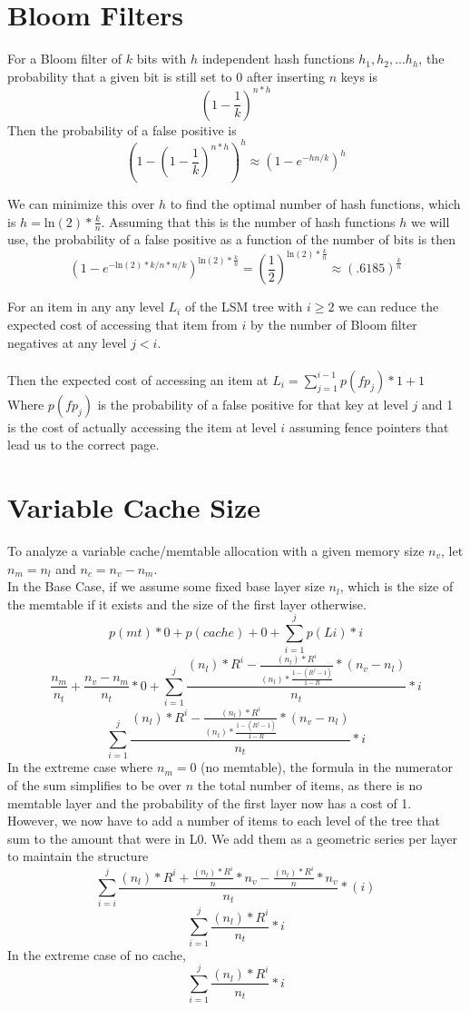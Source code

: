 \documentclass[11pt]{article}
\theoremstyle{plain}
\theoremstyle{definition}
\begin{document}
\section{Bloom Filters}

For a Bloom filter of $k$ bits with $h$ independent hash functions $h_1, h_2,...h_h$, the probability that a given bit is still set to 0 after inserting $n$ keys is 
$$
(1 - \frac{1}{k})^{n*h}
$$
Then the probability of a false positive is 
$$
(1- (1 - \frac{1}{k})^{n*h})^h \approx (1 - e^{-hn/k})^h
$$

We can minimize this over $h$ to find the optimal number of hash functions, which is $h = \mathrm{ln}(2) * \frac{k}{n}$. Assuming that this is the number of hash functions $h$ we will use, the probability of a false positive as a function of the number of bits is then 
$$
(1 - e^{-\mathrm{ln}(2)*k/n*n/k})^{\mathrm{ln}(2) * \frac{k}{n}} = (\frac{1}{2}) ^ {\mathrm{ln}(2) * \frac{k}{n}} \approx (.6185) ^  {\frac{k}{n}}
$$

For an item in any any level $L_i$ of the LSM tree with $i \geq 2$ we can reduce the expected cost of accessing that item from $i$ by the number of Bloom filter negatives at any level $j<i$. \\ \\
Then the expected cost of accessing an item at $L_i =  \sum_{j=1}^{i-1} p(fp_j) * 1 + 1$
Where $p(fp_j)$ is the probability of a false positive for that key at level $j$ and 1 is the cost of actually accessing the item at level $i$ assuming fence pointers that lead us to the correct page.

\section{Variable Cache Size}
To analyze a variable cache/memtable allocation with a given memory size $n_v$, let $n_m = n_l$ and $n_c =n_v - n_m$.\\
In the Base Case, if we assume some fixed base layer size $n_l$, which is the size of the memtable if it exists and the size of the first layer otherwise.
$$
p(mt) * 0  + p(cache) + 0 + \sum_{i=1}^j p(Li) * i 
$$
$$
\frac{n_m}{n_t} +  \frac{n_v - n_m}{n_t}*0 + \sum_{i=1}^j \frac{(n_l) * R^i - \frac{(n_l) * R^i}{(n_l) * \frac{1-(R^j-1)}{1-R}} * (n_v-n_l)}{n_t} * i 
$$
$$
\sum_{i=1}^j \frac{(n_l) * R^i - \frac{(n_l) * R^i}{(n_l) * \frac{1-(R^j-1)}{1-R}} * (n_v-n_l)}{n_t} * i 
$$
In the extreme case where $n_m=0$ (no memtable), the formula in the numerator of the sum simplifies to be over $n$ the total number of items, as there is no memtable layer and the probability of the first layer now has a cost of 1. However, we now have to add a number of items to each level of the tree that sum to the amount that were in L0. We add them as a geometric series per layer to maintain the structure
$$
\sum_{i=i}^{j} \frac{(n_l) * R^{i} + \frac{(n_l) * R^{i}}{n} * n_v - \frac{(n_l) * R^{i}}{n} * n_v}{n_t} * (i)
$$
$$
\sum_{i=1}^j \frac{(n_l) * R^i}{n_t} * i 
$$
In the extreme case of no cache, 
$$
\sum_{i=1}^j \frac{(n_l) * R^i}{n_t} * i 
$$
\end{document}
